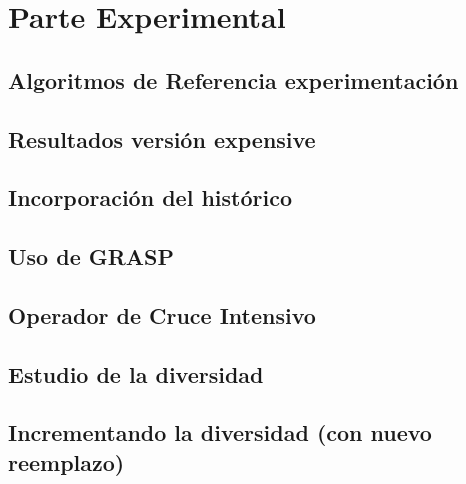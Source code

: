 \chapter{Parte Experimental}

\section{Algoritmos de Referencia experimentación}

\section{Resultados versión expensive}

\section{Incorporación del histórico}

\section{Uso de GRASP}

\section{Operador de Cruce Intensivo}

\section{Estudio de la diversidad}

\section{Incrementando la diversidad (con nuevo reemplazo)}